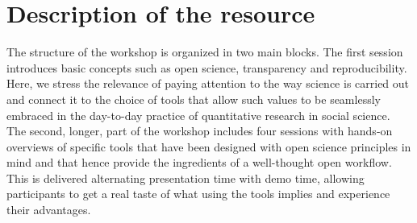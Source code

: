 \documentclass[scrartcl,a4paper,utopia,10pt]{article}
\begin{document}
\section{Description of the resource}
\label{sec-2}

The structure of the workshop is organized in two main blocks. The first
session introduces basic concepts such as open science, transparency and
reproducibility. Here, we stress the relevance of paying attention to the way
science is carried out and connect it to the choice of tools that allow such
values to be seamlessly embraced in the day-to-day practice of quantitative
research in social science. The second, longer, part of the workshop includes
four sessions with hands-on overviews of specific tools that have been
designed with open science principles in mind and that hence provide the
ingredients of a well-thought open workflow. This is delivered alternating
presentation time with demo time, allowing participants to get a real taste of
what using the tools implies and experience their advantages. 
\end{document}
